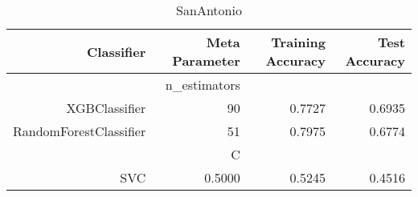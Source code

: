 
\begin{table}[H]
    \caption{SanAntonio}
    \centering
    \begin{tabular}{|r|r|r|r|}
        \hline
        Classifier &Meta Parameter &Training Accuracy
        &Test Accuracy\\
        \hline
        &n\_estimators &\multicolumn{2}{|r|}{}\\
        \hline
        XGBClassifier &90 &0.7727 &0.6935\\
        \hline
        RandomForestClassifier &51 &0.7975 &0.6774\\
        \hline
        &C &\multicolumn{2}{|r|}{}\\
        \hline
        SVC &0.5000 &0.5245 &0.4516\\
        \hline
    \end{tabular}
\end{table}

